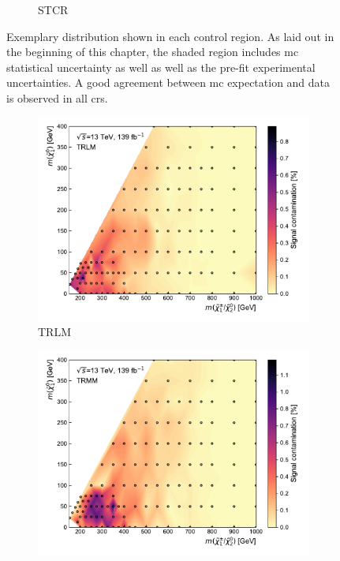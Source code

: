\begin{figure}
\begin{subfigure}[b]{0.5\linewidth}
		\caption{STCR\label{fig:signal_contaminations_STCR}}
	\end{subfigure}\hfill

	\caption{Exemplary distribution shown in each control region. As laid out in the beginning of this chapter, the shaded region includes \gls{mc} statistical uncertainty as well as well as the pre-fit experimental uncertainties. A good agreement between \gls{mc} expectation and data is observed in all \glspl{cr}.}
	\label{fig:CR_distributions_prefit}
\end{figure}

 \begin{figure}
	\centering
	\begin{subfigure}[b]{0.5\linewidth}
		\centering\includegraphics[width=1.0\textwidth]{signal_contamination/plot_TRLM}
		\caption{TRLM\label{fig:signal_contamination_TRLM}}
	\end{subfigure}\hfill
	\begin{subfigure}[b]{0.5\linewidth}
		\centering\includegraphics[width=1.0\textwidth]{signal_contamination/plot_TRMM}

\end{subfigure}
\end{figure}
